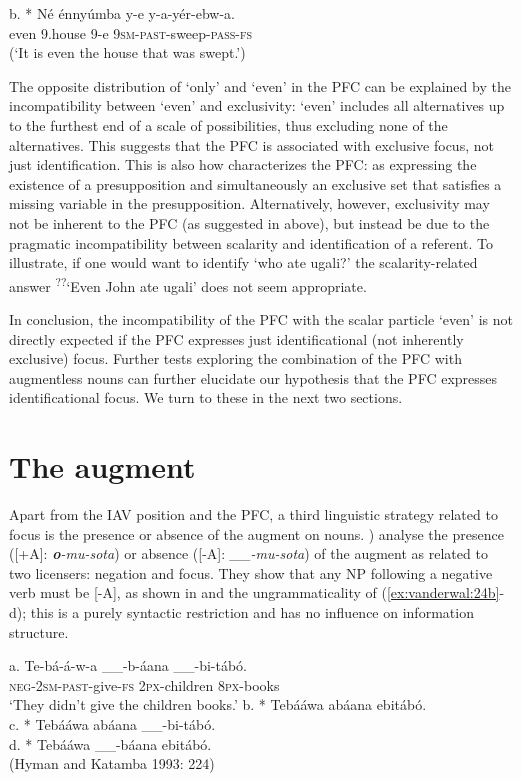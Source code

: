 \documentclass[output=paper]{langsci/langscibook}
\begin{document}
\ea
\gll   b.  * Né  énnyúmba  y-e  y-a-yér-ebw-a.\\
         even  9.house  9-e  \textsc{9sm}-\textsc{past}-sweep-\textsc{pass}-\textsc{fs}\\
\glt     (‘It is even the house that was swept.’)
\z

The opposite distribution of ‘only’ and ‘even’ in the PFC can be explained by the incompatibility between ‘even’ and exclusivity: ‘even’ includes all alternatives up to the furthest end of a scale of possibilities, thus excluding none of the alternatives. This suggests that the PFC is associated with exclusive focus, not just identification. This is also how \citet[52]{Walusimbi1996} characterizes the PFC: as expressing the existence of a presupposition and simultaneously an exclusive set that satisfies a missing variable in the presupposition. Alternatively, however, exclusivity may not be inherent to the PFC (as suggested in  above), but instead be due to the pragmatic incompatibility between scalarity and identification of a referent. To illustrate, if one would want to identify ‘who ate ugali?’ the scalarity-related answer \textsuperscript{??}‘Even John ate ugali’ does not seem appropriate.

  In conclusion, the incompatibility of the PFC with the scalar particle ‘even’ is not directly expected if the PFC expresses just identificational (not inherently exclusive) focus. Further tests exploring the combination of the PFC with augmentless nouns can further elucidate our hypothesis that the PFC expresses identificational focus. We turn to these in the next two sections.

\section{The augment}

Apart from the IAV position and the PFC, a third linguistic strategy related to focus is the presence or absence of the augment on nouns. \citet{HymanKatamba1990,HymanKatamba1993}) analyse the presence ([+A]: \textbf{\textit{o}}\textit{-mu-sota}) or absence ([-A]: \textit{\_\_-mu-sota}) of the augment as related to two licensers: negation and focus. They show that any NP following a negative verb must be [-A], as shown in  and the ungrammaticality of (\ref{ex:vanderwal:24b}-d); this is a purely syntactic restriction and has no influence on information structure.

\ea
\ea
\gll a.  Te-bá-á-w-a      \_\_-b-áana    \_\_-bi-tábó.\\
       \textsc{neg}-\textsc{2sm}-\textsc{past}-give-\textsc{fs}       \textsc{2px}-children       \textsc{8px}-books\\
\glt   ‘They didn't give the children books.’
\ex b.  * Tebááwa abáana ebitábó.\\
\ex c.  * Tebááwa abáana \_\_-bi-tábó.\\
\ex d.  * Tebááwa \_\_-báana ebitábó. \\
\glt (Hyman and Katamba 1993: 224)
\z
\z
\end{document}
